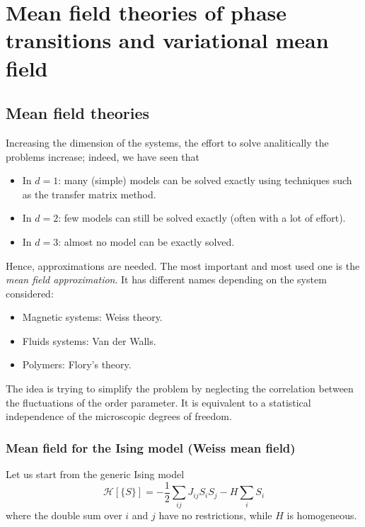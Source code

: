 \documentclass[../../Main/Main.tex]{subfiles}
\begin{document}
\chapter{Mean field theories of phase transitions and variational mean field}

\section{Mean field theories}

Increasing the dimension of the systems, the effort to solve analitically the problems increase; indeed, we have seen that
\begin{itemize}
\item In \( d=1 \): many (simple) models can be solved exactly using techniques such as the transfer matrix method.
\item In \( d=2 \): few models can still be solved exactly (often with a lot of effort).
\item In \( d=3 \): almost no model can be exactly solved.
\end{itemize}
Hence, approximations are needed.
The most important and most used one is the \emph{mean field approximation}. 
It has different names depending on the system considered:
\begin{itemize}
\item Magnetic systems: Weiss theory.
\item Fluids systems: Van der Walls.
\item Polymers: Flory's theory.
\end{itemize}

The idea is trying to simplify the problem by neglecting the correlation between the fluctuations of the order parameter. It is equivalent to a statistical independence of the microscopic degrees of freedom.



\subsection{Mean field for the Ising model (Weiss mean field)}
Let us start from the generic Ising model
\begin{equation}
  \mathcal{H} [\{ S \}  ] =  -\frac{1}{2} \sum_{ij}^{} J_{ij} S_i S_j - H \sum_{i}^{} S_i
\end{equation}
where the double sum over \( i \) and \( j \) have no restrictions, while \( H \) is homogeneous.
\end{document}
